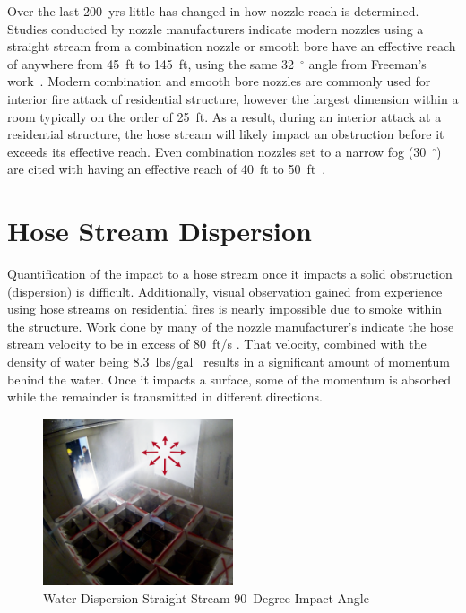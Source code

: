 \documentclass[12pt,oneside]{book}
\begin{document}
Over the last 200~yrs little has changed in how nozzle reach is determined. Studies conducted by nozzle manufacturers indicate modern nozzles using a straight stream from a combination nozzle or smooth bore have an effective reach of anywhere from 45~ft to 145~ft, using the same 32~$^\circ$ angle from Freeman's work~\cite{TFT_Reach,Elkhart_Reach,Akron_Reach}. Modern combination and smooth bore nozzles are commonly used for interior fire attack of residential structure, however the largest dimension within a room typically on the order of 25~ft. As a result, during an interior attack at a residential structure, the hose stream will likely impact an obstruction before it exceeds its effective reach. Even combination nozzles set to a narrow fog (30~$^\circ$) are cited with having an effective reach of 40~ft to 50~ft~\cite{Elkhart_Reach}.

\section{Hose Stream Dispersion}

Quantification of the impact to a hose stream once it impacts a solid obstruction (dispersion) is difficult. Additionally, visual observation gained from experience using hose streams on residential fires is nearly impossible due to smoke within the structure. Work done by many of the nozzle manufacturer's indicate the hose stream velocity to be in excess of 80~ft/s \cite{NBFU:EffectiveReach}. That velocity, combined with the density of water being 8.3~lbs/gal~\cite{SFPEHandbookPurser} results in a significant amount of momentum behind the water. Once it impacts a surface, some of the momentum is absorbed while the remainder is transmitted in different directions. 

\begin{figure}[H]
\centering
\includegraphics[width=0.5\textwidth]{Figures/Water_Distribution/Nozzle_Directions/Exterior_AtWall_SB_Arrows.png}
\caption{Water Dispersion Straight Stream 90~Degree Impact Angle}
\label{fig:90DegreeImpact}
\end{figure}
\end{document}
